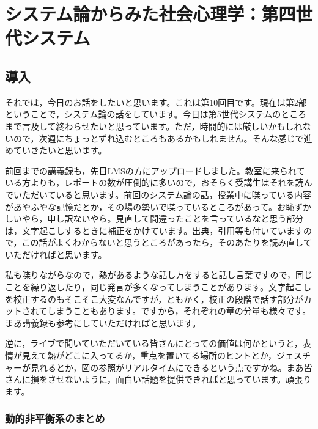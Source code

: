 \documentclass{ltjsbook}
\begin{document}
\setcounter{chapter}{9}
\chapter{システム論からみた社会心理学：第四世代システム}
\label{sp10_system}

\section{導入}

それでは，今日のお話をしたいと思います。これは第10回目です。現在は第2部ということで，システム論の話をしています。今日は第5世代システムのところまで言及して終わらせたいと思っています。ただ，時間的には厳しいかもしれないので，次週にちょっとずれ込むところもあるかもしれません。そんな感じで進めていきたいと思います。

前回までの講義録も，先日LMSの方にアップロードしました。教室に来られている方よりも，レポートの数が圧倒的に多いので，おそらく受講生はそれを読んでいただいていると思います。前回のシステム論の話，授業中に喋っている内容があやふやな記憶だとか，その場の勢いで喋っているところがあって。お恥ずかしいやら，申し訳ないやら。見直して間違ったことを言っているなと思う部分は，文字起こしするときに補正をかけています。出典，引用等も付いていますので，この話がよくわからないと思うところがあったら，そのあたりを読み直していただければと思います。

私も喋りながらなので，熱があるような話し方をすると話し言葉ですので，同じことを繰り返したり，同じ発言が多くなってしまうことがあります。文字起こしを校正するのもそこそこ大変なんですが，ともかく，校正の段階で話す部分がカットされてしまうこともあります。ですから，それぞれの章の分量も様々です。まあ講義録も参考にしていただければと思います。

逆に，ライブで聞いていただいている皆さんにとっての価値は何かというと，表情が見えて熱がどこに入ってるか，重点を置いてる場所のヒントとか，ジェスチャーが見れるとか，図の参照がリアルタイムにできるという点ですかね。まあ皆さんに損をさせないように，面白い話題を提供できればと思っています。頑張ります。

\subsection{動的非平衡系のまとめ}
\end{document}

